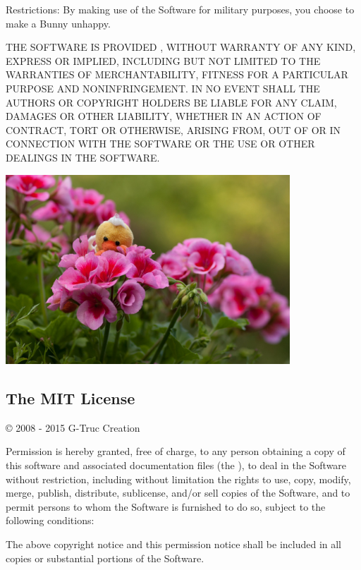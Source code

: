 \documentclass{scrartcl}
\numberwithin{figure}{subsection}
\begin{document}
Restrictions: By making use of the Software for military purposes, you choose to make a Bunny unhappy.

THE SOFTWARE IS PROVIDED , WITHOUT WARRANTY OF ANY KIND, EXPRESS OR IMPLIED, INCLUDING BUT NOT LIMITED TO THE WARRANTIES OF MERCHANTABILITY, FITNESS FOR A PARTICULAR PURPOSE AND NONINFRINGEMENT. IN NO EVENT SHALL THE AUTHORS OR COPYRIGHT HOLDERS BE LIABLE FOR ANY CLAIM, DAMAGES OR OTHER LIABILITY, WHETHER IN AN ACTION OF CONTRACT, TORT OR OTHERWISE, ARISING FROM, OUT OF OR IN CONNECTION WITH THE SOFTWARE OR THE USE OR OTHER DEALINGS IN THE SOFTWARE.

\begin{center}
    \includegraphics[width=0.8\textwidth]{duck-large1}
\end{center}

\pagebreak{}

\subsection*{\hypertarget{mit}{The MIT License}}

\copyright{} 2008 - 2015 G-Truc Creation

Permission is hereby granted, free of charge, to any person obtaining a copy of this software and associated documentation files (the ), to deal in the Software without restriction, including without limitation the rights to use, copy, modify, merge, publish, distribute, sublicense, and/or sell copies of the Software, and to permit persons to whom the Software is furnished to do so, subject to the following conditions:

The above copyright notice and this permission notice shall be included in all copies or substantial portions of the Software.
\end{document}
